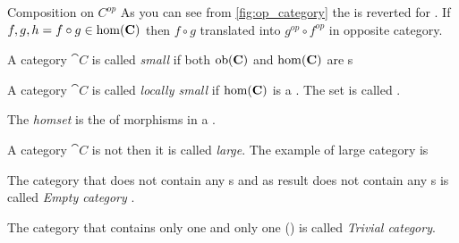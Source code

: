 \begin{remark}{Composition on $C^{op}$}
\label{rem:op_composition}
As you can see from \cref{fig:op_category} the
 is reverted for
. If $f,g,h = f \circ g \in
\mathrm{hom}(\mathbf{C})$ then $f \circ g$ translated into $g^{op} \circ
f^{op}$ in opposite category.
\end{remark}

\begin{definition}
\label{def:small_category}
A category $\cat{C}$ is called \textit{small} if both $\mathrm{ob}(\mathbf{C})$ and
$\mathrm{hom}(\mathbf{C})$ are s
\end{definition}

\begin{definition}
\label{def:localy_small_category}

A category $\cat{C}$ is called \textit{locally small} if 
$\mathrm{hom}(\mathbf{C})$ is a . The set is called .
\end{definition}

\begin{definition}[Homset]
\label{def:homset}
The \textit{homset} is the  of morphisms in a
. 
\end{definition}


\begin{definition}
\label{def:large_category}
A category $\cat{C}$ is not  then it is
called \textit{large}. The example of large category is
\end{definition}

\begin{definition}
\label{def:empty_category}
The category that does not contain any s and as
result does not contain any s is called
\textit{Empty category} \cite{bib:stackexchange:empty_category}.
\end{definition}

\begin{definition}
\label{def:trivial_category}
The category that contains only one  and only
one  ()  is called
\textit{Trivial category}.
\end{definition}

